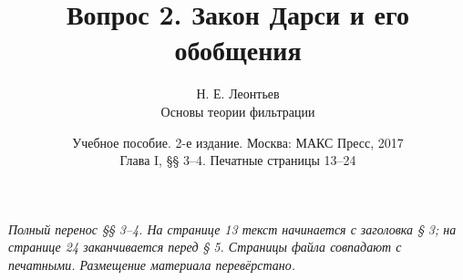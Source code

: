 \documentclass[12pt,a4paper]{article}
\title{Вопрос 2. Закон Дарси и его обобщения}
\author{Н. Е. Леонтьев\\\large Основы теории фильтрации}
\date{Учебное пособие. 2-е издание. Москва: МАКС Пресс, 2017\\Глава I, §§ 3--4. Печатные страницы 13--24}
\begin{document}
\maketitle
\noindent\textit{Полный перенос §§ 3--4. На странице 13 текст начинается с заголовка § 3; на странице 24 заканчивается перед § 5. Страницы файла совпадают с печатными. Размещение материала перевёрстано.}

\end{document}
